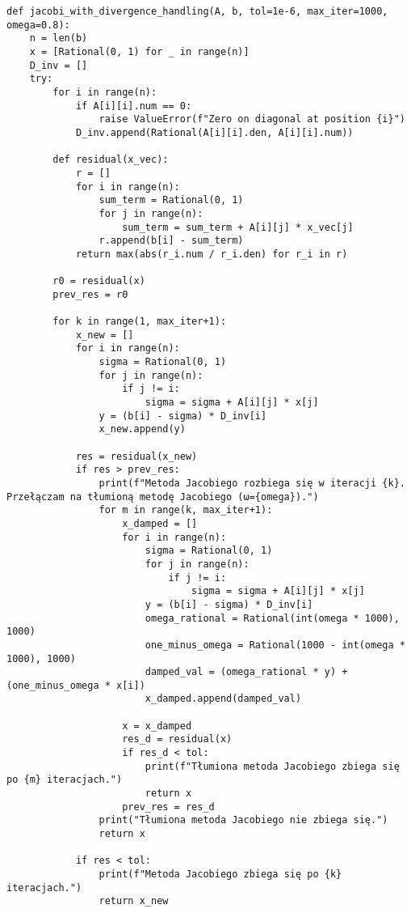 \documentclass[a4paper,12pt]{article}
\begin{document}
\begin{lstlisting}
def jacobi_with_divergence_handling(A, b, tol=1e-6, max_iter=1000, omega=0.8):
    n = len(b)
    x = [Rational(0, 1) for _ in range(n)]
    D_inv = []
    try:
        for i in range(n):
            if A[i][i].num == 0:
                raise ValueError(f"Zero on diagonal at position {i}")
            D_inv.append(Rational(A[i][i].den, A[i][i].num))

        def residual(x_vec):
            r = []
            for i in range(n):
                sum_term = Rational(0, 1)
                for j in range(n):
                    sum_term = sum_term + A[i][j] * x_vec[j]
                r.append(b[i] - sum_term)
            return max(abs(r_i.num / r_i.den) for r_i in r)

        r0 = residual(x)
        prev_res = r0

        for k in range(1, max_iter+1):
            x_new = []
            for i in range(n):
                sigma = Rational(0, 1)
                for j in range(n):
                    if j != i:
                        sigma = sigma + A[i][j] * x[j]
                y = (b[i] - sigma) * D_inv[i]
                x_new.append(y)
            
            res = residual(x_new)
            if res > prev_res:
                print(f"Metoda Jacobiego rozbiega się w iteracji {k}. Przełączam na tłumioną metodę Jacobiego (ω={omega}).")
                for m in range(k, max_iter+1):
                    x_damped = []
                    for i in range(n):
                        sigma = Rational(0, 1)
                        for j in range(n):
                            if j != i:
                                sigma = sigma + A[i][j] * x[j]
                        y = (b[i] - sigma) * D_inv[i]
                        omega_rational = Rational(int(omega * 1000), 1000) 
                        one_minus_omega = Rational(1000 - int(omega * 1000), 1000)
                        damped_val = (omega_rational * y) + (one_minus_omega * x[i])
                        x_damped.append(damped_val)
                    
                    x = x_damped
                    res_d = residual(x)
                    if res_d < tol:
                        print(f"Tłumiona metoda Jacobiego zbiega się po {m} iteracjach.")
                        return x
                    prev_res = res_d
                print("Tłumiona metoda Jacobiego nie zbiega się.")
                return x

            if res < tol:
                print(f"Metoda Jacobiego zbiega się po {k} iteracjach.")
                return x_new


\end{lstlisting}
\end{document}
